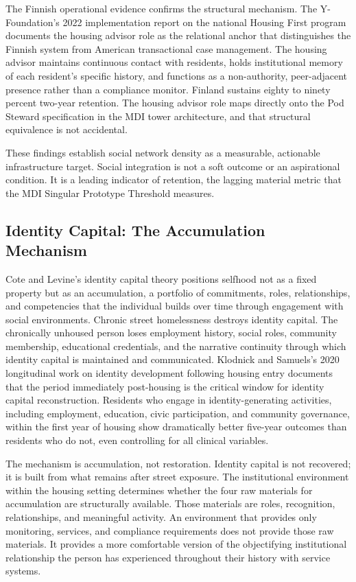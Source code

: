 \documentclass[12pt, letterpaper]{article}
\begin{document}
The Finnish operational evidence confirms the structural mechanism. The Y-Foundation's 2022 implementation report on the national Housing First program documents the housing advisor role as the relational anchor that distinguishes the Finnish system from American transactional case management. The housing advisor maintains continuous contact with residents, holds institutional memory of each resident's specific history, and functions as a non-authority, peer-adjacent presence rather than a compliance monitor. Finland sustains eighty to ninety percent two-year retention. The housing advisor role maps directly onto the Pod Steward specification in the MDI tower architecture, and that structural equivalence is not accidental.

These findings establish social network density as a measurable, actionable infrastructure target. Social integration is not a soft outcome or an aspirational condition. It is a leading indicator of retention, the lagging material metric that the MDI Singular Prototype Threshold measures.

\subsection{Identity Capital: The Accumulation Mechanism}

Cote and Levine's identity capital theory positions selfhood not as a fixed property but as an accumulation, a portfolio of commitments, roles, relationships, and competencies that the individual builds over time through engagement with social environments. Chronic street homelessness destroys identity capital. The chronically unhoused person loses employment history, social roles, community membership, educational credentials, and the narrative continuity through which identity capital is maintained and communicated. Klodnick and Samuels's 2020 longitudinal work on identity development following housing entry documents that the period immediately post-housing is the critical window for identity capital reconstruction. Residents who engage in identity-generating activities, including employment, education, civic participation, and community governance, within the first year of housing show dramatically better five-year outcomes than residents who do not, even controlling for all clinical variables.

The mechanism is accumulation, not restoration. Identity capital is not recovered; it is built from what remains after street exposure. The institutional environment within the housing setting determines whether the four raw materials for accumulation are structurally available. Those materials are roles, recognition, relationships, and meaningful activity. An environment that provides only monitoring, services, and compliance requirements does not provide those raw materials. It provides a more comfortable version of the objectifying institutional relationship the person has experienced throughout their history with service systems.
\end{document}
